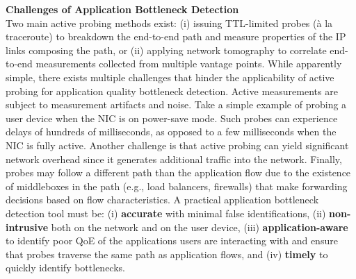 \documentclass[11 pt]{article}
\begin{document}
\noindent \textbf{Challenges of Application Bottleneck Detection}\\

Two main active probing methods exist: (i) issuing TTL-limited probes (\`{a} la traceroute) to breakdown the end-to-end path and measure properties of the IP links composing the path, or (ii) applying network tomography to correlate end-to-end measurements collected from multiple vantage points. While apparently simple, there exists multiple challenges that hinder the applicability of active probing for application quality bottleneck detection. Active measurements are subject to measurement artifacts and noise. Take a simple example of probing a user device when the NIC is on power-save mode. Such probes can experience delays of hundreds of milliseconds, as opposed to a few milliseconds when the NIC is fully active. Another challenge is that active probing can yield significant network overhead since it generates additional traffic into the network. Finally, probes may follow a different path than the application flow due to the existence of middleboxes in the path (e.g., load balancers, firewalls) that make forwarding decisions based on flow characteristics. A practical application bottleneck detection tool must be: (i) \textbf{accurate} with minimal false identifications, (ii) \textbf{non-intrusive} both on the network and on the user device, (iii) \textbf{application-aware} to identify poor QoE of the applications users are interacting with and ensure that probes traverse the same path as application flows, and (iv) \textbf{timely} to quickly identify bottlenecks.\\
%

\end{document}
